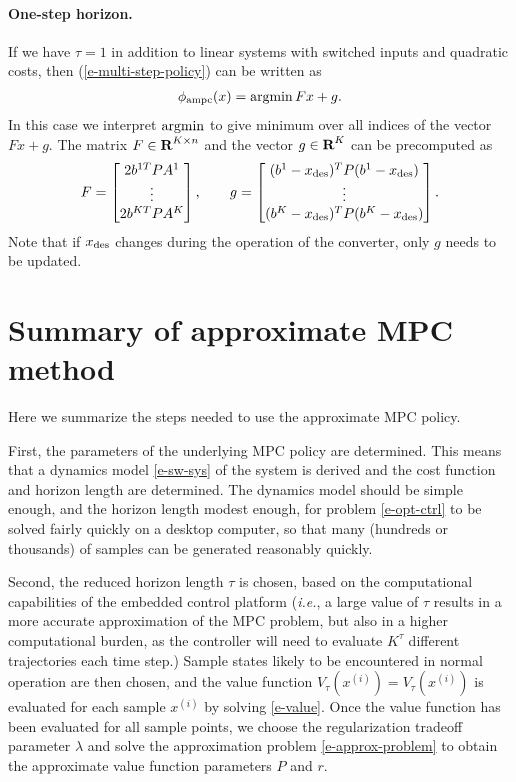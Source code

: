\documentclass[12pt]{article}
\newcommand{\ie}{{\it i.e.}}
\newcommand{\reals}{{\mbox{\bf R}}}
\newcommand{\argmin}{\mathop{\rm argmin}}
\begin{document}
\paragraph{One-step horizon.} 
If we have $\tau = 1$ in addition to 
linear systems with switched inputs and quadratic costs,
then (\ref{e-multi-step-policy}) can be written as
\begin{align*}
\phi_{\rm ampc}(x) = \argmin Fx + g.
\end{align*}
In this case we interpret $\argmin$ 
to give minimum over all indices of the vector $Fx + g$.
The matrix $F \in \reals^{K \times n}$ and 
the vector $g \in \reals^K$ can be precomputed as
\[
F =
\begin{bmatrix}
2b^{1T} P A^1 \\
\vdots \\
2b^{KT} P A^K \\
\end{bmatrix},
\qquad
g =
\begin{bmatrix}
(b^1 - x_{\rm des})^T P (b^1 - x_{\rm des}) \\
\vdots \\
(b^K - x_{\rm des})^T P (b^K - x_{\rm des})
\end{bmatrix}.
\]
Note that if $x_{\rm des}$ changes during the operation of the converter,
only $g$ needs to be updated.

\section{Summary of approximate MPC method}
Here we summarize the steps needed to use the approximate MPC policy.

First, the parameters of the underlying MPC policy are determined.
This means that a dynamics model \eqref{e-sw-sys}
of the system is derived and
the cost function and horizon length are determined.
The dynamics model should be simple enough, and the horizon length modest enough,
for problem \eqref{e-opt-ctrl}
to be solved fairly quickly on a desktop computer,
so that many (hundreds or thousands) of samples can be generated reasonably quickly.

Second,
the reduced horizon length $\tau$ is chosen,
based on the computational capabilities of the embedded control platform
(\ie, a large value of $\tau$ 
results in a more accurate approximation of the MPC problem,
but also in a higher computational burden,
as the controller will need to evaluate $K^\tau$ different trajectories each time step.)
Sample states likely to be encountered in normal operation are then chosen,
and the value function $V_\tau(x^{(i)}) = V_\tau(x^{(i)})$
is evaluated for each sample $x^{(i)}$ by solving \eqref{e-value}.
Once the value function has been evaluated for all sample points,
we choose the regularization tradeoff parameter $\lambda$
and solve the approximation problem \eqref{e-approx-problem}
to obtain the approximate value function
parameters $P$ and $r$.
\end{document}
